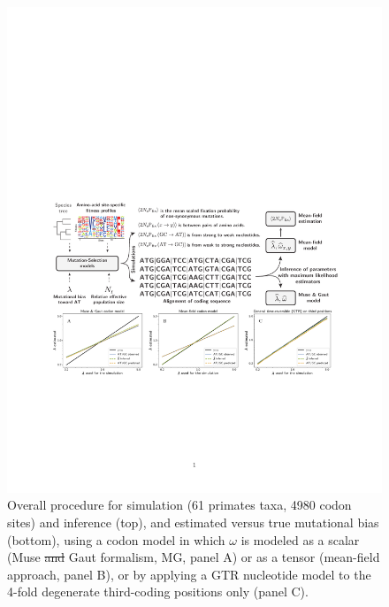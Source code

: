 \documentclass{article}
\providecommand{\DIFaddtex}[1]{{\protect\color{blue}\uwave{#1}}} %
\providecommand{\DIFdeltex}[1]{{\protect\color{red}\sout{#1}}}                      %
\providecommand{\DIFaddFL}[1]{\DIFadd{#1}} %
\providecommand{\DIFdelFL}[1]{\DIFdel{#1}} %
\providecommand{\DIFaddbeginFL}{} %
\providecommand{\DIFaddendFL}{} %
\providecommand{\DIFdelbeginFL}{} %
\providecommand{\DIFdelendFL}{} %
\providecommand{\DIFadd}[1]{\texorpdfstring{\DIFaddtex{#1}}{#1}} %
\providecommand{\DIFdel}[1]{\texorpdfstring{\DIFdeltex{#1}}{}} %
\begin{document}
\begin{figure}[!htb]
\DIFdelendFL \DIFaddbeginFL \includegraphics[width=\linewidth, page=1]{figure2}
 \DIFaddendFL \caption[Estimation of mutational bias]{
  Overall procedure for simulation (61 primates taxa, 4980 codon sites) and inference (top), and estimated versus true mutational bias (bottom), using a codon model in which $\omega$ is modeled as a scalar (Muse \DIFdelbeginFL \DIFdelFL{and }\DIFdelendFL \DIFaddbeginFL \DIFaddFL{\& }\DIFaddendFL Gaut formalism, MG, panel A) or as a tensor (mean-field approach, panel B), or by applying a GTR nucleotide model to the 4-fold degenerate third-coding positions only (panel C).
 }
 \label{fig:mut-bias-inference}
\end{figure}
\end{document}
